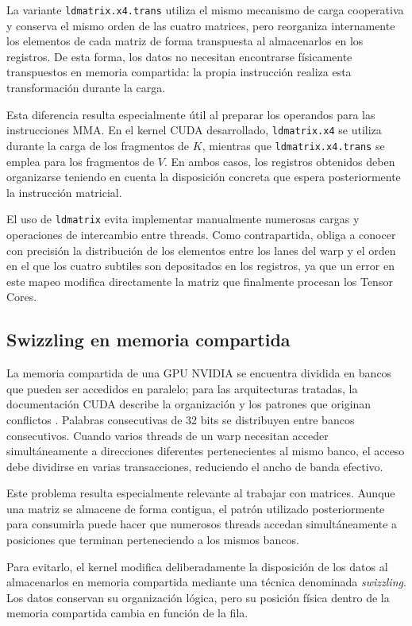 La variante \texttt{ldmatrix.x4.trans} utiliza el mismo mecanismo de carga cooperativa y conserva el mismo orden de las cuatro matrices, pero reorganiza internamente los elementos de cada matriz de forma transpuesta al almacenarlos en los registros. De esta forma, los datos no necesitan encontrarse físicamente transpuestos en memoria compartida: la propia instrucción realiza esta transformación durante la carga.

Esta diferencia resulta especialmente útil al preparar los operandos para las instrucciones MMA. En el kernel CUDA desarrollado, \texttt{ldmatrix.x4} se utiliza durante la carga de los fragmentos de \(K\), mientras que \texttt{ldmatrix.x4.trans} se emplea para los fragmentos de \(V\). En ambos casos, los registros obtenidos deben organizarse teniendo en cuenta la disposición concreta que espera posteriormente la instrucción matricial.

El uso de \texttt{ldmatrix} evita implementar manualmente numerosas cargas y operaciones de intercambio entre threads. Como contrapartida, obliga a conocer con precisión la distribución de los elementos entre los lanes del warp y el orden en el que los cuatro subtiles son depositados en los registros, ya que un error en este mapeo modifica directamente la matriz que finalmente procesan los Tensor Cores.

\subsection{Swizzling en memoria compartida}

La memoria compartida de una GPU NVIDIA se encuentra dividida en bancos que pueden ser accedidos en paralelo; para las arquitecturas tratadas, la documentación CUDA describe la organización y los patrones que originan conflictos \cite{cudaProgrammingGuide}. Palabras consecutivas de 32 bits se distribuyen entre bancos consecutivos. Cuando varios threads de un warp necesitan acceder simultáneamente a direcciones diferentes pertenecientes al mismo banco, el acceso debe dividirse en varias transacciones, reduciendo el ancho de banda efectivo.

Este problema resulta especialmente relevante al trabajar con matrices. Aunque una matriz se almacene de forma contigua, el patrón utilizado posteriormente para consumirla puede hacer que numerosos threads accedan simultáneamente a posiciones que terminan perteneciendo a los mismos bancos.

Para evitarlo, el kernel modifica deliberadamente la disposición de los datos al almacenarlos en memoria compartida mediante una técnica denominada \textit{swizzling}. Los datos conservan su organización lógica, pero su posición física dentro de la memoria compartida cambia en función de la fila.

